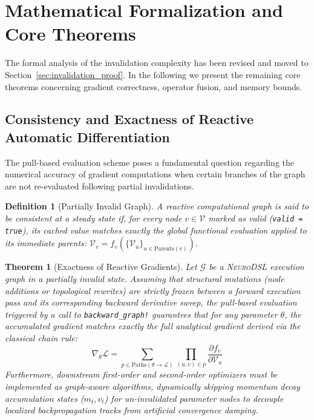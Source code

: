 \documentclass{article}
\newtheorem{theorem}{Theorem}
\newtheorem{definition}{Definition}
\begin{document}
\section{Mathematical Formalization and Core Theorems}
\label{sec:formalization_core}

The formal analysis of the invalidation complexity has been revised and moved to Section~\ref{sec:invalidation_proof}. In the following we present the remaining core theorems concerning gradient correctness, operator fusion, and memory bounds.

\subsection{Consistency and Exactness of Reactive Automatic Differentiation}

The pull-based evaluation scheme poses a fundamental question regarding the numerical accuracy of gradient computations when certain branches of the graph are not re-evaluated following partial invalidations.

\begin{definition}[Partially Invalid Graph]
A reactive computational graph is said to be consistent at a steady state if, for every node $v \in \mathcal{V}$ marked as valid (\texttt{valid = true}), its cached value matches exactly the global functional evaluation applied to its immediate parents: $\mathcal{V}_v = f_v\left(\{\mathcal{V}_u\}_{u \in \text{Parents}(v)}\right)$.
\end{definition}

\begin{theorem}[Exactness of Reactive Gradients]
Let $\mathcal{G}$ be a \textsc{NeuroDSL} execution graph in a partially invalid state. Assuming that structural mutations (node additions or topological rewrites) are strictly frozen between a forward execution pass and its corresponding backward derivative sweep, the pull-based evaluation triggered by a call to \texttt{backward\_graph!} guarantees that for any parameter $\theta$, the accumulated gradient matches exactly the full analytical gradient derived via the classical chain rule:
\begin{equation}
\nabla_{\theta} \mathcal{L} = \sum_{p \in \text{Paths}(\theta \to \mathcal{L})} \prod_{(u,v) \in p} \frac{\partial f_v}{\partial \mathcal{V}_u}
\end{equation}
Furthermore, downstream first-order and second-order optimizers must be implemented as graph-aware algorithms, dynamically skipping momentum decay accumulation states ($m_t, v_t$) for un-invalidated parameter nodes to decouple localized backpropagation tracks from artificial convergence damping.
\end{theorem}
\end{document}
